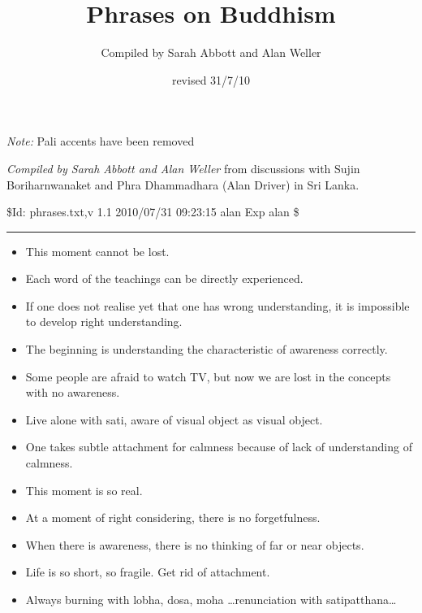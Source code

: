 \documentclass{article}
\title{Phrases on Buddhism}
\author{Compiled by Sarah Abbott and Alan Weller}
\date{revised 31/7/10}
\begin{document}
\maketitle

\emph{Note:} Pali accents have been removed

\emph{Compiled by Sarah Abbott and Alan Weller} from discussions
with Sujin Boriharnwanaket and Phra Dhammadhara (Alan Driver) in
Sri Lanka.

\$Id: phrases.txt,v 1.1 2010/07/31 09:23:15 alan Exp alan \$

\begin{center}\rule{3in}{0.4pt}\end{center}

\begin{itemize}
\item 
  This moment cannot be lost.

\item 
  Each word of the teachings can be directly experienced.

\item 
  If one does not realise yet that one has wrong understanding, it is
  impossible to develop right understanding.

\item 
  The beginning is understanding the characteristic of awareness
  correctly.

\item 
  Some people are afraid to watch TV, but now we are lost in the
  concepts with no awareness.

\item 
  Live alone with sati, aware of visual object as visual object.

\item 
  One takes subtle attachment for calmness because of lack of
  understanding of calmness.

\item 
  This moment is so real.

\item 
  At a moment of right considering, there is no forgetfulness.

\item 
  When there is awareness, there is no thinking of far or near
  objects.

\item 
  Life is so short, so fragile. Get rid of attachment.

\item 
  Always burning with lobha, dosa, moha \ldots{}renunciation with
  satipatthana\ldots{}


\end{itemize}
\end{document}
